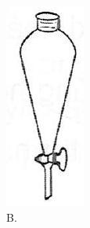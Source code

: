 \documentclass[10pt]{article}
\begin{document}
\begin{figure}[h]
\begin{center}
\captionsetup{labelformat=empty}
\caption{B.}
  \includegraphics[width=\textwidth]{2025_10_23_de6f5713836e4e91b3c8g-014}
\end{center}
\end{figure}
\end{document}

